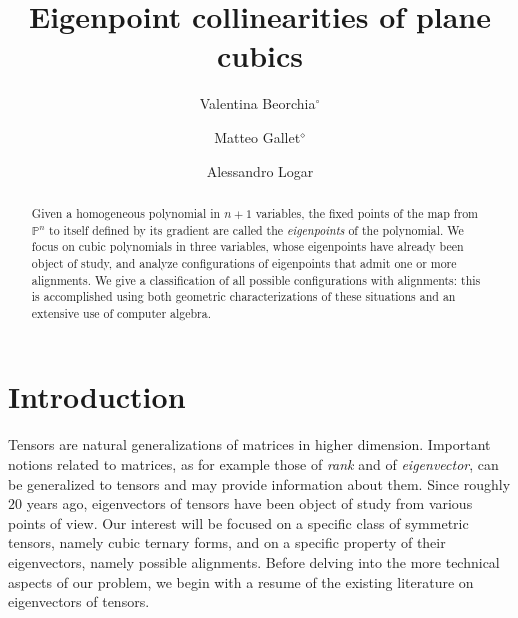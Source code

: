 \documentclass[a4paper, 11pt, reqno]{amsart}
\title{Eigenpoint collinearities of plane cubics}
\author[Valentina Beorchia]{Valentina Beorchia$^{\circ}$}
\author[Matteo Gallet]{Matteo Gallet$^{\diamond}$}
\author[Alessandro Logar]{Alessandro Logar}
\date{}
\theoremstyle{plain}
\theoremstyle{definition}
\newcommand{\p}{\mathbb{P}}
\begin{document}
\begin{abstract}
 Given a homogeneous polynomial in $n+1$ variables, the fixed points of the map from $\p^n$ to itself defined by its gradient are called the \emph{eigenpoints} of the polynomial. We focus on cubic polynomials in three variables, whose eigenpoints have already been object of study, and analyze configurations of eigenpoints that admit one or more alignments. We give a classification of all possible configurations with alignments: this is accomplished using both geometric characterizations of these situations and an extensive use of computer algebra.
\end{abstract}

\maketitle


\section{Introduction}
\label{introduction}

Tensors are natural generalizations of matrices in higher dimension.
Important notions related to matrices, as for example those of \emph{rank} and of \emph{eigenvector},
can be generalized to tensors and may provide information about them.
Since roughly $20$ years ago, eigenvectors of tensors have been object of study from various points of view.
Our interest will be focused on a specific class of symmetric tensors, namely cubic ternary forms, and on a specific property of their eigenvectors, namely possible alignments.
Before delving into the more technical aspects of our problem,
we begin with a resume of the existing literature on eigenvectors of tensors.
\end{document}
